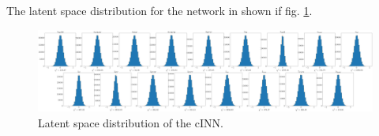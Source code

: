 


\Subsection{\textcolor{red}{Latent Space Distribution}}

The latent space distribution for the network in shown if fig. \ref{fig:latents}.

\begin{figure}[h!]
	\centering
	\includegraphics[width=\textwidth]{figures/inference/latent_space.png}
	\caption{Latent space distribution of the cINN.}
	\label{fig:latents}
\end{figure}

\Subsection{\textcolor{red}{Calibration Curves}}

\Subsection{\textcolor{red}{Network Predictions}}

\Subsection{\textcolor{red}{Benchmark Comparison}}